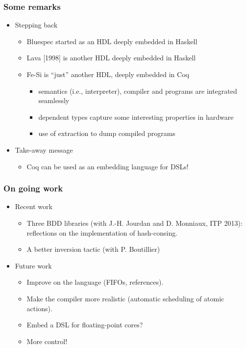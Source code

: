 \documentclass[9pt]{beamer}
\newcommand\fesi{Fe-Si}
\begin{document}
\begin{frame}[fragile]
  \frametitle{Some remarks}
  \begin{itemize}

  \item Stepping back
    \begin{itemize}
    \item Bluespec started as an HDL deeply embedded in Haskell
    \item Lava [1998] is another HDL deeply embedded in Haskell
    \item \fesi{} is ``just'' another HDL,  deeply embedded in \alert{Coq}
      \pause
      \begin{itemize}
      \item semantics (i.e., interpreter), compiler and programs are \alert{integrated seamlessly}
      \item dependent types capture some interesting properties in
        hardware
      \item use of extraction to dump compiled programs
      \end{itemize}
    \end{itemize}

    \pause
    
  \item Take-away message
    \begin{itemize}
    \item Coq can be used as an embedding language for DSLs!
    \end{itemize}
    
  \end{itemize}
\end{frame}

\begin{frame}
  \frametitle{On going work}

  \begin{itemize}
  \item Recent work
    \begin{itemize}
    \item Three BDD libraries (with J.-H. Jourdan and D. Monniaux, ITP
      2013): reflections on the implementation of hash-consing.
    \item A better inversion tactic (with P. Boutillier)
    \end{itemize}

  \item Future work
    \begin{itemize}
    \item Improve on the language (FIFOs, references).
    \item Make the compiler more realistic (automatic scheduling of
      atomic actions).
    \item Embed a DSL for floating-point cores?
    \item More control!
    \end{itemize}
  \end{itemize}
\end{frame}
\end{document}
